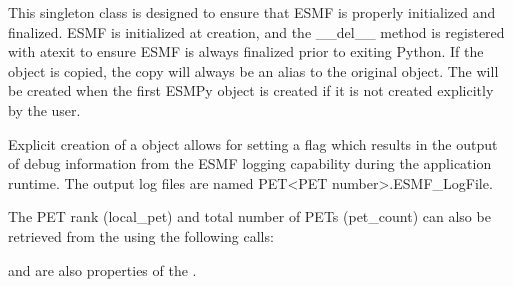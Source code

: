 \documentclass[letterpaper,10pt,english]{sphinxmanual}
\begin{document}
\begin{fulllineitems}
\label{\detokenize{manager:ESMF.api.esmpymanager.Manager}}
This singleton class is designed to ensure that ESMF is properly initialized 
and finalized.  ESMF is initialized at 
{\hyperref[\detokenize{manager:ESMF.api.esmpymanager.Manager}]{}} creation, and the \_\_del\_\_ 
method is registered with atexit to ensure ESMF is always finalized prior to 
exiting Python.  If the object is copied, the copy will always be an alias 
to the original {\hyperref[\detokenize{manager:ESMF.api.esmpymanager.Manager}]{}} object.  The 
{\hyperref[\detokenize{manager:ESMF.api.esmpymanager.Manager}]{}} will be created when the first 
ESMPy object is created if it is not created explicitly by the user.

Explicit creation of a {\hyperref[\detokenize{manager:ESMF.api.esmpymanager.Manager}]{}} object allows
for setting a flag which 
results in the output of debug information from the ESMF logging capability 
during the application runtime.  The output log files are named 
PET\textless{}PET number\textgreater{}.ESMF\_LogFile.

The PET rank (local\_pet) and total number of PETs (pet\_count) 
can also be retrieved from the {\hyperref[\detokenize{manager:ESMF.api.esmpymanager.Manager}]{}} 
using the following calls:

\begin{sphinxVerbatim}[commandchars=\\\{\}]
\end{sphinxVerbatim}

 and  are also properties of the 
{\hyperref[\detokenize{manager:ESMF.api.esmpymanager.Manager}]{}}.


\end{fulllineitems}
\end{document}
